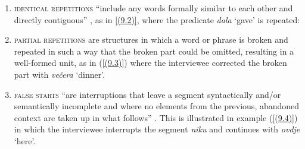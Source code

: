 \begin{enumerate}
	\setcounter{enumi}{0}
\item \textsc{identical repetitions} “include any words formally similar to each other and directly contiguous” \citep[73]{Crible18}, as in \ref{(9.2)}, where the predicate \textit{dala} ‘gave’ is repeated:



\item \textsc{partial repetitions} are structures in which a word or phrase is broken and repeated in such a way that the broken part could be omitted, resulting in a well-formed unit, as in (\ref{(9.3)}) where the interviewee corrected the broken part with \textit{večera} ‘dinner’. 



\item \textsc{false starts} “are interruptions that leave a segment syntactically and/or semantically incomplete and where no elements from the previous, abandoned context are taken up in what follows” \citep[73]{Crible18}. This is illustrated in example (\ref{(9.4)}) in which the interviewee interrupts the segment \textit{niku} and continues with \textit{ovdje} ‘here’.



\end{enumerate}
